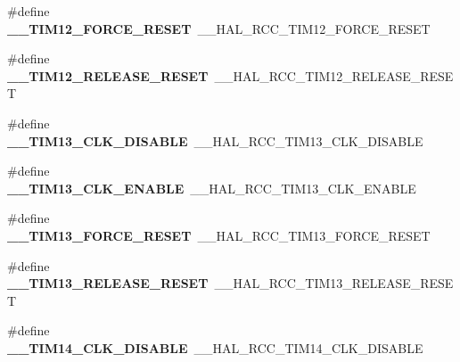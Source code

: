 \begin{DoxyCompactItemize}
\#define {\bfseries \+\_\+\+\_\+\+T\+I\+M12\+\_\+\+F\+O\+R\+C\+E\+\_\+\+R\+E\+S\+ET}~\+\_\+\+\_\+\+H\+A\+L\+\_\+\+R\+C\+C\+\_\+\+T\+I\+M12\+\_\+\+F\+O\+R\+C\+E\+\_\+\+R\+E\+S\+ET
\item 
\mbox{\label{group___h_a_l___r_c_c___aliased_gab3ad7993389232812fa3634cb8f7909f}} 
\#define {\bfseries \+\_\+\+\_\+\+T\+I\+M12\+\_\+\+R\+E\+L\+E\+A\+S\+E\+\_\+\+R\+E\+S\+ET}~\+\_\+\+\_\+\+H\+A\+L\+\_\+\+R\+C\+C\+\_\+\+T\+I\+M12\+\_\+\+R\+E\+L\+E\+A\+S\+E\+\_\+\+R\+E\+S\+ET
\item 
\mbox{\label{group___h_a_l___r_c_c___aliased_gacfec356657ad501040bd9429cbdaa07f}} 
\#define {\bfseries \+\_\+\+\_\+\+T\+I\+M13\+\_\+\+C\+L\+K\+\_\+\+D\+I\+S\+A\+B\+LE}~\+\_\+\+\_\+\+H\+A\+L\+\_\+\+R\+C\+C\+\_\+\+T\+I\+M13\+\_\+\+C\+L\+K\+\_\+\+D\+I\+S\+A\+B\+LE
\item 
\mbox{\label{group___h_a_l___r_c_c___aliased_gaad8f664f4f9f4425f5ca94591107a7a7}} 
\#define {\bfseries \+\_\+\+\_\+\+T\+I\+M13\+\_\+\+C\+L\+K\+\_\+\+E\+N\+A\+B\+LE}~\+\_\+\+\_\+\+H\+A\+L\+\_\+\+R\+C\+C\+\_\+\+T\+I\+M13\+\_\+\+C\+L\+K\+\_\+\+E\+N\+A\+B\+LE
\item 
\mbox{\label{group___h_a_l___r_c_c___aliased_ga93a1ee53bfd837e622370714d258835e}} 
\#define {\bfseries \+\_\+\+\_\+\+T\+I\+M13\+\_\+\+F\+O\+R\+C\+E\+\_\+\+R\+E\+S\+ET}~\+\_\+\+\_\+\+H\+A\+L\+\_\+\+R\+C\+C\+\_\+\+T\+I\+M13\+\_\+\+F\+O\+R\+C\+E\+\_\+\+R\+E\+S\+ET
\item 
\mbox{\label{group___h_a_l___r_c_c___aliased_ga6f650b47d31086ec19b1c1a146124930}} 
\#define {\bfseries \+\_\+\+\_\+\+T\+I\+M13\+\_\+\+R\+E\+L\+E\+A\+S\+E\+\_\+\+R\+E\+S\+ET}~\+\_\+\+\_\+\+H\+A\+L\+\_\+\+R\+C\+C\+\_\+\+T\+I\+M13\+\_\+\+R\+E\+L\+E\+A\+S\+E\+\_\+\+R\+E\+S\+ET
\item 
\mbox{\label{group___h_a_l___r_c_c___aliased_gae9d1d7754509af407addaa6e96e35e95}} 
\#define {\bfseries \+\_\+\+\_\+\+T\+I\+M14\+\_\+\+C\+L\+K\+\_\+\+D\+I\+S\+A\+B\+LE}~\+\_\+\+\_\+\+H\+A\+L\+\_\+\+R\+C\+C\+\_\+\+T\+I\+M14\+\_\+\+C\+L\+K\+\_\+\+D\+I\+S\+A\+B\+LE
\item 
\mbox{\label{group___h_a_l___r_c_c___aliased_ga17ea8a6c97269b92eb4c267565e1504c}} 

\end{DoxyCompactItemize}
